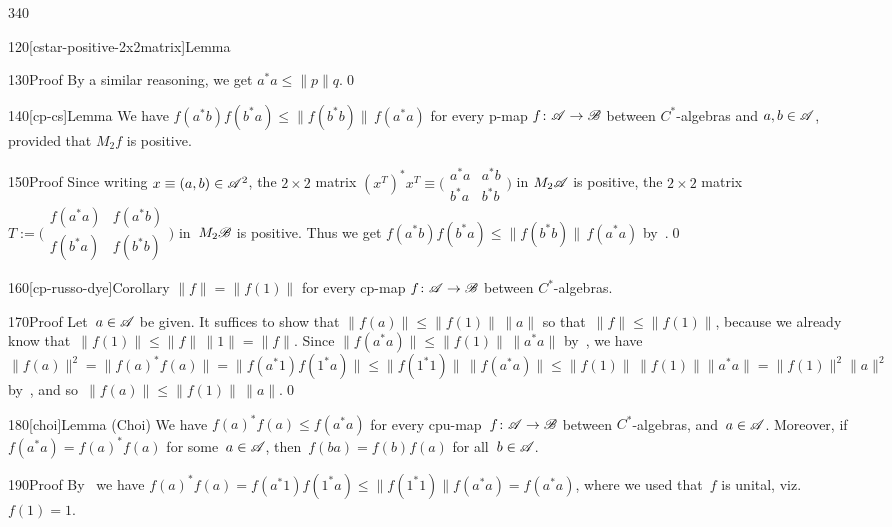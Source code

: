 \begin{parsec}{340}
\begin{point}{120}[cstar-positive-2x2matrix]{Lemma}
\begin{point}{130}{Proof}
By a similar reasoning, we get $a^*a\leq \|p\|q$.\qed
\end{point}
\end{point}
\begin{point}{140}[cp-cs]{Lemma}%
We have $f(a^*b) f(b^*a)\leq \|f(b^*b)\|\,f(a^*a)$
for every p-map $f\colon \mathscr{A}\to\mathscr{B}$
between $C^*$-algebras
and $a,b\in\mathscr{A}$,
provided that $M_2f$ is positive.
\begin{point}{150}{Proof}%
Since writing $x\equiv (a,b)\in \mathscr{A}^2$,
the $2\times 2$ matrix $(x^T)^* x^T\equiv 
	\bigl(
\begin{smallmatrix}
a^*a & a^*b \\
b^*a & b^* b
\end{smallmatrix} \bigr)$
in $M_2\mathscr{A}$
is positive,
the $2\times 2$ matrix $T:=\bigl(
\begin{smallmatrix}
	f(a^*a) & f(a^*b) \\
	f(b^*a) & f(b^* b)
\end{smallmatrix}\bigr)$
in~$M_2\mathscr{B}$ is positive.
Thus we get $f(a^*b) f(b^*a)\leq \|f(b^*b)\|\,f(a^*a)$
by~.\qed
\end{point}
\end{point}
\begin{point}{160}[cp-russo-dye]{Corollary}%
$\|f\|= \|f(1)\|$
for every cp-map $f\colon \mathscr{A}\to\mathscr{B}$ between $C^*$-algebras.
\begin{point}{170}{Proof}%
Let~$a\in\mathscr{A}$ be given.
It suffices to show that $\|f(a)\|\leq \|f(1)\|\,\|a\|$
so that~$\|f\|\leq\|f(1)\|$,
because we already know that~$\|f(1)\|\leq \|f\|\,\|1\| = \|f\|$.
Since $\|f(a^*a)\|\leq \|f(1)\|\,\|a^*a\|$
by~,
we have
 $\|f(a)\|^2=\|f(a)^*f(a)\|=\|f(a^*1)f(1^*a)\|
\leq \|f(1^*1)\|\,\|f(a^*a)\|
\leq \|f(1)\|\, \|f(1)\|\|a^*a\|
= \|f(1)\|^2 \|a\|^2$
by~,
and so~$\|f(a)\|\leq \|f(1)\|\,\|a\|$.\qed
\end{point}
\end{point}
\begin{point}{180}[choi]{Lemma (Choi\cite{choi})}%
%
We have
$f(a)^*f(a) \leq f(a^* a)$ for
every
cpu-map~$f\colon \mathscr{A}\to\mathscr{B}$ between $C^*$-algebras,
and~$a\in\mathscr{A}$.
Moreover, if $f(a^*a)=f(a)^*f(a)$
for some~$a\in\mathscr{A}$,
then~$f(ba)=f(b)f(a)$
for all~$b\in \mathscr{A}$.
\begin{point}{190}{Proof}%
By~
we have $f(a)^*f(a)=f(a^* 1)f(1^* a) \leq
\|f(1^*1)\| f(a^*a)=f(a^*a)$,
where we used that~$f$ is unital, viz.~$f(1)=1$.


\end{point}
\end{point}
\end{parsec}
